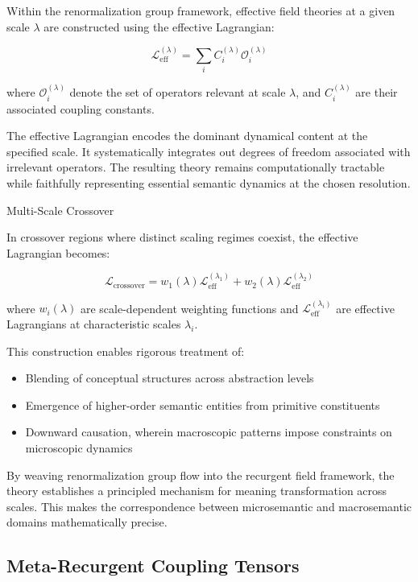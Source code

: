 Within the renormalization group framework, effective field theories at a given scale \(\lambda\) are constructed using the effective Lagrangian:

\begin{equation}
\mathcal{L}_{\mathrm{eff}}^{(\lambda)} = \sum_{i} C_{i}^{(\lambda)} \mathcal{O}_{i}^{(\lambda)}
\end{equation}

where \(\mathcal{O}_{i}^{(\lambda)}\) denote the set of operators relevant at scale \(\lambda\), and \(C_{i}^{(\lambda)}\) are their associated coupling constants.

The effective Lagrangian encodes the dominant dynamical content at the specified scale. It systematically integrates out degrees of freedom associated with irrelevant operators. The resulting theory remains computationally tractable while faithfully representing essential semantic dynamics at the chosen resolution.

Multi-Scale Crossover

In crossover regions where distinct scaling regimes coexist, the effective Lagrangian becomes:

\begin{equation}
\mathcal{L}_{\text{crossover}} = w_1(\lambda) \mathcal{L}_{\text{eff}}^{(\lambda_1)} + w_2(\lambda) \mathcal{L}_{\text{eff}}^{(\lambda_2)}
\end{equation}

where \(w_i(\lambda)\) are scale-dependent weighting functions and \(\mathcal{L}_{\text{eff}}^{(\lambda_i)}\) are effective Lagrangians at characteristic scales \(\lambda_i\).

This construction enables rigorous treatment of:
\begin{itemize}
    \item Blending of conceptual structures across abstraction levels
    \item Emergence of higher-order semantic entities from primitive constituents
    \item Downward causation, wherein macroscopic patterns impose constraints on microscopic dynamics
\end{itemize}

By weaving renormalization group flow into the recurgent field framework, the theory establishes a principled mechanism for meaning transformation across scales. This makes the correspondence between microsemantic and macrosemantic domains mathematically precise.

\subsection{Meta-Recurgent Coupling Tensors}

